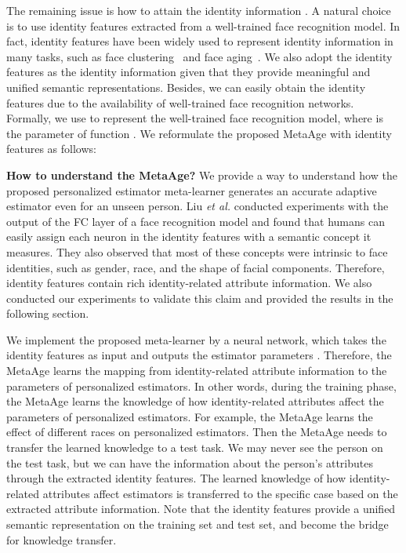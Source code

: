 \documentclass[journal,twoside]{IEEEtran}
\begin{document}
The remaining issue is how to attain the identity information . A natural choice is to use identity features extracted from a well-trained face recognition model. In fact, identity features have been widely used to represent identity information in many tasks, such as face clustering~\cite{yang2020learning} and face aging~\cite{liu2019attribute}. We also adopt the identity features as the identity information  given that they provide meaningful and  unified semantic representations. Besides, we can easily obtain the identity features due to the availability of well-trained face recognition networks. Formally, we use  to represent the well-trained face recognition model, where  is the parameter of function . We reformulate the proposed MetaAge with identity features  as follows:





\textbf{How to understand the MetaAge?} We provide a way to understand how the proposed personalized estimator meta-learner generates an accurate adaptive estimator even for an unseen person. Liu \emph{et al.} \cite{liu2015deep} conducted experiments with the output of the FC layer of a face recognition model and found that humans can easily assign each neuron in the identity features with a semantic concept it measures. They also observed that most of these concepts were intrinsic to face identities, such as gender, race, and the shape of facial components. Therefore, identity features contain rich identity-related attribute information. We also conducted our experiments to validate this claim and provided the results in the following section.

We implement the proposed meta-learner by a neural network, which takes the identity features  as input and outputs the estimator parameters . Therefore, the MetaAge learns the mapping from identity-related attribute information to the parameters of personalized estimators. In other words, during the training phase, the MetaAge learns the knowledge of how identity-related attributes affect the parameters of personalized estimators. For example, the MetaAge learns the effect of different races on personalized estimators. Then the MetaAge needs to transfer the learned knowledge to a test task. We may never see the person on the test task, but we can have the information about the person's attributes through the extracted identity features. The learned knowledge of how identity-related attributes affect estimators is transferred to the specific case based on the extracted attribute information. Note that the identity features provide a unified semantic representation on the training set and test set, and become the bridge for knowledge transfer.
\end{document}
